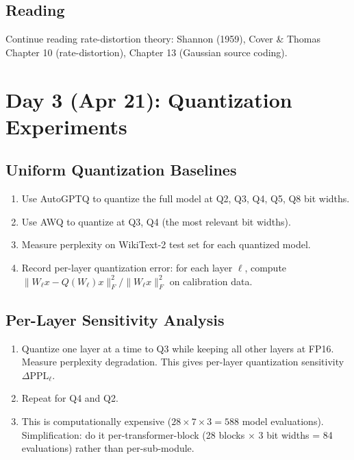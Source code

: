 \documentclass[11pt,a4paper]{article}
\begin{document}
\subsection{Reading}
Continue reading rate-distortion theory: Shannon (1959), Cover \& Thomas Chapter 10 (rate-distortion), Chapter 13 (Gaussian source coding).

\section{Day 3 (Apr 21): Quantization Experiments}

\subsection{Uniform Quantization Baselines}
\begin{enumerate}
    \item Use AutoGPTQ to quantize the full model at Q2, Q3, Q4, Q5, Q8 bit widths.
    \item Use AWQ to quantize at Q3, Q4 (the most relevant bit widths).
    \item Measure perplexity on WikiText-2 test set for each quantized model.
    \item Record per-layer quantization error: for each layer $\ell$, compute $\|W_\ell x - Q(W_\ell) x\|_F^2 / \|W_\ell x\|_F^2$ on calibration data.
\end{enumerate}

\subsection{Per-Layer Sensitivity Analysis}
\begin{enumerate}
    \item Quantize one layer at a time to Q3 while keeping all other layers at FP16. Measure perplexity degradation. This gives per-layer quantization sensitivity $\Delta \text{PPL}_\ell$.
    \item Repeat for Q4 and Q2.
    \item This is computationally expensive ($28 \times 7 \times 3 = 588$ model evaluations). Simplification: do it per-transformer-block (28 blocks $\times$ 3 bit widths = 84 evaluations) rather than per-sub-module.
\end{enumerate}
\end{document}
